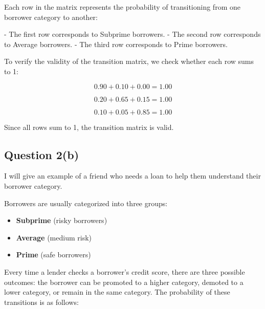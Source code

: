 \documentclass{article}
\begin{document}
Each row in the matrix represents the probability of transitioning from one borrower category to another:

- The first row corresponds to Subprime borrowers.
- The second row corresponds to Average borrowers.
- The third row corresponds to Prime borrowers.

To verify the validity of the transition matrix, we check whether each row sums to 1:

\[
0.90 + 0.10 + 0.00 = 1.00
\]

\[
0.20 + 0.65 + 0.15 = 1.00
\]

\[
0.10 + 0.05 + 0.85 = 1.00
\]

Since all rows sum to 1, the transition matrix is valid.


\subsection{Question 2(b)}
I will give an example of a friend who needs a loan to help them understand their borrower category. 

Borrowers are usually categorized into three groups:
\begin{itemize}
    \item \textbf{Subprime} (risky borrowers)
    \item \textbf{Average} (medium risk)
    \item \textbf{Prime} (safe borrowers)
\end{itemize}

Every time a lender checks a borrower’s credit score, there are three possible outcomes: the borrower can be promoted to a higher category, demoted to a lower category, or remain in the same category. The probability of these transitions is as follows:
\end{document}
